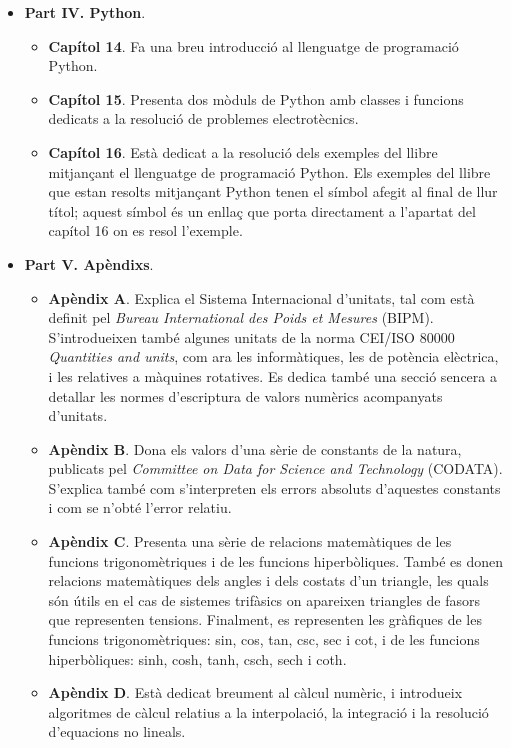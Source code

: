 \begin{itemize}
\begin{itemize}
		\end{itemize}
		\item \textbf{Part IV. Python}. 
		\begin{itemize}
			\item \textbf{Capítol 14}. Fa una breu introducció al llenguatge de programació Python.
			\item \textbf{Capítol 15}. Presenta dos mòduls de Python amb classes i funcions dedicats a la resolució de problemes electrotècnics.
			\item \textbf{Capítol 16}. Està dedicat  a la resolució dels exemples del llibre mitjançant el llenguatge de programació Python. Els exemples del llibre que estan resolts mitjançant Python tenen el símbol \faPython{} afegit al final de llur títol; aquest símbol és un enllaç que porta directament a l'apartat del capítol 16 on es resol l'exemple.
		\end{itemize}
		\item \textbf{Part V. Apèndixs}. 
		\begin{itemize}
			\item \textbf{Apèndix A}. Explica el Sistema Internacional d'unitats, tal com està definit pel \textit{Bureau International des Poids et Mesures} (BIPM). S'introdueixen també algunes unitats de la norma CEI/ISO 80000 \textit{Quantities and units}, com ara les informàtiques, les de potència elèctrica, i les relatives a màquines rotatives. Es dedica també una secció sencera a detallar les normes d'escriptura de valors numèrics acompanyats d'unitats.
			\item \textbf{Apèndix B}. Dona els valors d'una sèrie de constants de la natura,   publicats
			pel \textit{Committee on Data for
			Science and Technology} (CODATA). S'explica també com s'interpreten els errors absoluts d'aquestes constants i com se n'obté l'error relatiu.
			\item \textbf{Apèndix C}. Presenta una sèrie de relacions matemàtiques de les funcions trigonomètriques i de les funcions hiperbòliques. També es donen relacions matemàtiques dels angles i dels costats d'un triangle, les quals són útils en el cas de sistemes trifàsics on apareixen triangles de fasors que representen tensions. Finalment, es representen les gràfiques de les funcions trigonomètriques: sin, cos, tan, csc, sec i cot, i de les funcions hiperbòliques: sinh, cosh, tanh, csch, sech i coth.
			\item \textbf{Apèndix D}. Està dedicat breument al càlcul numèric, i introdueix algoritmes de càlcul relatius a la interpolació, la integració i la resolució d'equacions no lineals.

\end{itemize}
\end{itemize}
